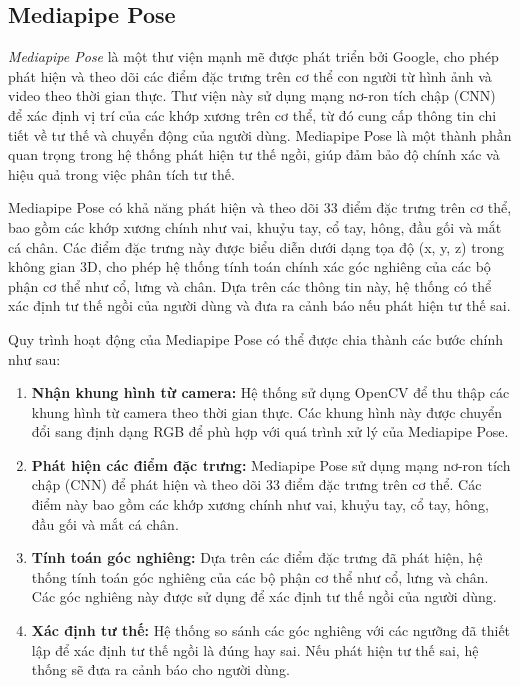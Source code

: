 \documentclass[conference]{IEEEtran}
\begin{document}
\subsection{Mediapipe Pose}
\textit{Mediapipe Pose} là một thư viện mạnh mẽ được phát triển bởi Google, cho phép phát hiện và theo dõi các điểm đặc trưng trên cơ thể con người từ hình ảnh và video theo thời gian thực. Thư viện này sử dụng mạng nơ-ron tích chập (CNN) để xác định vị trí của các khớp xương trên cơ thể, từ đó cung cấp thông tin chi tiết về tư thế và chuyển động của người dùng. Mediapipe Pose là một thành phần quan trọng trong hệ thống phát hiện tư thế ngồi, giúp đảm bảo độ chính xác và hiệu quả trong việc phân tích tư thế.

Mediapipe Pose có khả năng phát hiện và theo dõi 33 điểm đặc trưng trên cơ thể, bao gồm các khớp xương chính như vai, khuỷu tay, cổ tay, hông, đầu gối và mắt cá chân. Các điểm đặc trưng này được biểu diễn dưới dạng tọa độ (x, y, z) trong không gian 3D, cho phép hệ thống tính toán chính xác góc nghiêng của các bộ phận cơ thể như cổ, lưng và chân. Dựa trên các thông tin này, hệ thống có thể xác định tư thế ngồi của người dùng và đưa ra cảnh báo nếu phát hiện tư thế sai.

Quy trình hoạt động của Mediapipe Pose có thể được chia thành các bước chính như sau:

\begin{enumerate}
    \item \textbf{Nhận khung hình từ camera:} Hệ thống sử dụng OpenCV để thu thập các khung hình từ camera theo thời gian thực. Các khung hình này được chuyển đổi sang định dạng RGB để phù hợp với quá trình xử lý của Mediapipe Pose.
    \item \textbf{Phát hiện các điểm đặc trưng:} Mediapipe Pose sử dụng mạng nơ-ron tích chập (CNN) để phát hiện và theo dõi 33 điểm đặc trưng trên cơ thể. Các điểm này bao gồm các khớp xương chính như vai, khuỷu tay, cổ tay, hông, đầu gối và mắt cá chân.
    \item \textbf{Tính toán góc nghiêng:} Dựa trên các điểm đặc trưng đã phát hiện, hệ thống tính toán góc nghiêng của các bộ phận cơ thể như cổ, lưng và chân. Các góc nghiêng này được sử dụng để xác định tư thế ngồi của người dùng.
    \item \textbf{Xác định tư thế:} Hệ thống so sánh các góc nghiêng với các ngưỡng đã thiết lập để xác định tư thế ngồi là đúng hay sai. Nếu phát hiện tư thế sai, hệ thống sẽ đưa ra cảnh báo cho người dùng.
\end{enumerate}
\end{document}
